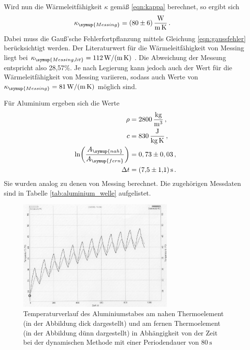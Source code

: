 Wird nun die Wärmeleitfähigkeit $\kappa$ gemäß \eqref{eqn:kappa} berechnet, so ergibt sich
\begin{align}
  \kappa_{\symup{Messing}} &= \SI{80(6)}{\watt\per\meter\per\kelvin}\,.\nonumber
\end{align}
Dabei muss die Gauß'sche Fehlerfortpflanzung mittels Gleichung \eqref{eqn:gaussfehler}
berücksichtigt werden.
Der Literaturwert für die Wärmeleitfähigkeit von Messing liegt bei
$\kappa_{\symup{Messing,lit}}=\SI{112}{\watt\per\meter\per\kelvin}$ \cite{Wärmeleitfähigkeit1}.
Die Abweichung der Messung entspricht also 28,57\%. Je nach Legierung kann
jedoch auch der Wert für die Wärmeleitfähigkeit von Messing variieren, sodass auch Werte von
$\kappa_{\symup{Messing}} = \SI{81}{\watt\per\meter\per\kelvin}$ \cite{Wärmeleitfähigkeit2}
möglich sind.




Für Aluminium ergeben sich die Werte
\begin{align}
  \rho &= \SI{2800}{\kilo\gram\per\cubic\meter}\,, \nonumber\\
  c &= \SI{830}{\joule\per\kilo\gram\per\kelvin}\,, \nonumber\\
  \ln\biggl(\frac{A_{\symup{nah}}}{A_{\symup{fern}}}\biggr) &= 0,73 \pm 0,03 \,, \nonumber\\
  \Delta t &= \SI{7.5(11)}{\second} \,.\nonumber
\end{align}
Sie wurden analog zu denen von Messing berechnet. Die zugehörigen Messdaten sind
in Tabelle \ref{tab:aluminium_welle} aufgelistet.

\begin{figure}
  \centering
  \includegraphics[width=0.7\textwidth]{data/t5undt6_welle.JPEG}
  \caption{Temperaturverlauf des Aluminiumstabes am nahen Thermoelement (in der Abbildung dick dargestellt)
  und am fernen Thermoelement (in der Abbildung dünn dargestellt) in Abhängigkeit von der Zeit bei der
  dynamischen Methode mit einer Periodendauer von $\SI{80}{\second}$}
  \label{fig:aluminium_welle}
\end{figure}

